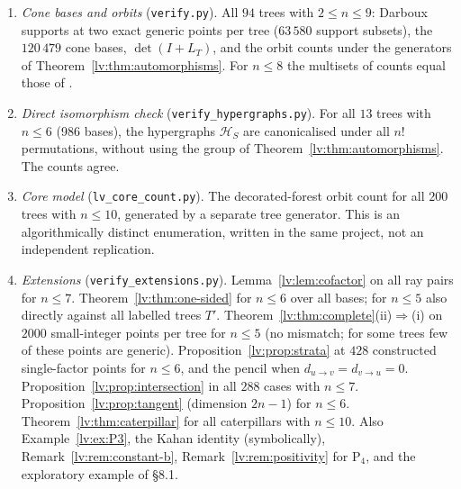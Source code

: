\documentclass[11pt,a4paper]{article}
\theoremstyle{definition}
\theoremstyle{remark}
\begin{document}
\begin{enumerate}
\item \emph{Cone bases and orbits} (\texttt{verify.py}). All $94$ trees with $2\leq n\leq9$: Darboux supports at two exact generic points per tree ($63\,580$ support subsets), the $120\,479$ cone bases, $\det(I+L_T)$, and the orbit counts under the generators of Theorem~\ref{lv:thm:automorphisms}. For $n\leq8$ the multisets of counts equal those of \cite[Table~7]{lv:K2025}.
\item \emph{Direct isomorphism check} (\texttt{verify\_hypergraphs.py}). For all $13$ trees with $n\leq6$ (986 bases), the hypergraphs $\mathcal H_S$ are canonicalised under all $n!$ permutations, without using the group of Theorem~\ref{lv:thm:automorphisms}. The counts agree.
\item \emph{Core model} (\texttt{lv\_core\_count.py}). The decorated-forest orbit count for all $200$ trees with $n\leq10$, generated by a separate tree generator. This is an algorithmically distinct enumeration, written in the same project, not an independent replication.
\item \emph{Extensions} (\texttt{verify\_extensions.py}). Lemma~\ref{lv:lem:cofactor} on all ray pairs for $n\leq7$. Theorem~\ref{lv:thm:one-sided} for $n\leq6$ over all bases; for $n\leq5$ also directly against all labelled trees $T'$. Theorem~\ref{lv:thm:complete}(ii)$\Rightarrow$(i) on $2000$ small-integer points per tree for $n\leq5$ (no mismatch; for some trees few of these points are generic). Proposition~\ref{lv:prop:strata} at $428$ constructed single-factor points for $n\leq6$, and the pencil when $d_{u\to v}=d_{v\to u}=0$. Proposition~\ref{lv:prop:intersection} in all $288$ cases with $n\leq7$. Proposition~\ref{lv:prop:tangent} (dimension $2n-1$) for $n\leq6$. Theorem~\ref{lv:thm:caterpillar} for all caterpillars with $n\leq10$. Also Example~\ref{lv:ex:P3}, the Kahan identity (symbolically), Remark~\ref{lv:rem:constant-b}, Remark~\ref{lv:rem:positivity} for P$_4$, and the exploratory example of \S8.1.
\end{enumerate}
\end{document}
